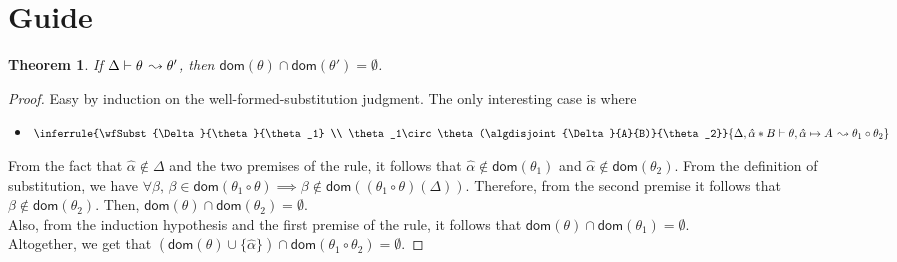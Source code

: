 \documentclass{article}
\newtheorem{theorem}{Theorem}
\begin{document}
\section{Guide}
\begin{theorem}
  \newcommand*{\dom}[1]{\mathsf{dom}(#1)}
  If $\Delta\vdash \theta\,\leadsto \theta'$, then $\dom{\theta}\cap\dom{\theta'}=\emptyset$.
\end{theorem}
\begin{proof}
  \newcommand*{\dom}[1]{\mathsf{dom}(#1)}
  Easy by induction on the well-formed-substitution judgment. The only interesting case is where
  \begin{itemize}
  \item \(\inferrule{\wfSubst{\Delta}{\theta}{\theta_1} \\ \theta_1\circ\theta(\algdisjoint{\Delta}{A}{B)}{\theta_2}}{\wfSubst{\Delta,\tentry{\hat{\alpha}}{B}}{\theta,\unification{\alpha}{A}}{\theta_1\circ\theta_2}}\)
  \end{itemize}
  From the fact that $\hat\alpha\not\in\Delta$ and the two premises of the rule, it follows that $\hat\alpha\not\in\dom{\theta_1}$ and $\hat\alpha\not\in\dom{\theta_2}$.
  From the definition of substitution, we have $\forall\beta,\,\beta\in\dom{\theta_1\circ\theta}\implies\beta\not\in\dom{(\theta_1\circ\theta)(\Delta)}$.
  Therefore, from the second premise it follows that $\beta\not\in\dom{\theta_2}$. Then, $\dom{\theta}\cap\dom{\theta_2}=\emptyset$.\\  
  Also, from the induction hypothesis and the first premise of the rule, it follows that $\dom{\theta}\cap\dom{\theta_1}=\emptyset$.\\
  Altogether, we get that $(\dom{\theta}\cup\{\hat\alpha\})\cap\dom{\theta_1\circ\theta_2}=\emptyset$.
\end{proof}
\end{document}
